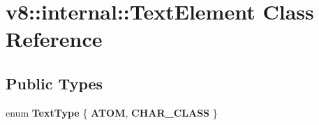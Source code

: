\hypertarget{classv8_1_1internal_1_1TextElement}{}\section{v8\+:\+:internal\+:\+:Text\+Element Class Reference}
\label{classv8_1_1internal_1_1TextElement}
\subsection*{Public Types}
\begin{DoxyCompactItemize}
\item 
\mbox{\label{classv8_1_1internal_1_1TextElement_af1fc18991cc961bd15cabdcc4f1363e4}} 
enum {\bfseries Text\+Type} \{ {\bfseries A\+T\+OM}, 
{\bfseries C\+H\+A\+R\+\_\+\+C\+L\+A\+SS}
 \}
\end{DoxyCompactItemize}
